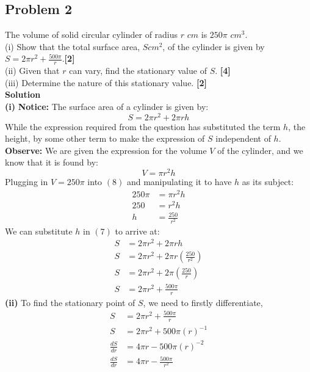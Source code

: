 \documentclass[hidelinks, a4paper, 12pt]{article}
\newcommand{\bd}{\textbf}
\newcommand{\n}{\\[\baselineskip]}
\begin{document}
        \subsection{Problem 2}
            The volume of solid circular cylinder of radius $r$ $cm$ is $250\pi$ $cm^3$.\n
            (i) Show that the total surface area, $Scm^2$, of the cylinder is given by $S = 2\pi r^2 + \frac{500\pi}{r}$.\bd{[2]}\n
            (ii) Given that $r$ can vary, find the stationary value of $S$. \bd{[4]}\n
            (iii) Determine the nature of this stationary value. \bd{[2]}\n
            \bd{Solution}\n
            \bd{(i)} \bd{Notice:} The surface area of a cylinder is given by:
            \begin{equation}
                S = 2\pi r^2 + 2\pi r h
            \end{equation}
            While the expression required from the question has substituted the term $h$, the height, by some other term to make the expression of $S$ independent of $h$.\n
            \bd{Observe:} We are given the expression for the volume $V$ of the cylinder, and we know that it is found by:
            \begin{equation}V = \pi r^2h\end{equation}
            Plugging in $V = 250\pi$ into $(8)$ and manipulating it to have $h$ as its subject:
            \[\begin{split}
                250\pi &= \pi r^2h\\
                250 &= r^2h\\
                h &= \frac{250}{r^2}
            \end{split}\]
            We can substitute $h$ in $(7)$ to arrive at:
            \[\begin{split}
                S &= 2\pi r^2 + 2\pi r h\\
                S &= 2\pi r^2 + 2\pi r \left(\frac{250}{r^2}\right)\\
                S &= 2\pi r^2 + 2\pi\left(\frac{250}{r}\right)\\
                S &= 2\pi r^2 + \frac{500\pi}{r}
            \end{split}\]
            \bd{(ii)} To find the stationary point of $S$, we need to firstly differentiate,
            \[\begin{split}
                S &= 2\pi r^2 + \frac{500\pi}{r}\\
                S &= 2\pi r^2 + 500\pi(r)^{-1}\\
                \frac{dS}{dr} &= 4\pi r- 500\pi(r)^{-2}\\
                \frac{dS}{dr} &= 4\pi r -\frac{500\pi}{r^2}
            \end{split}\]
\end{document}
